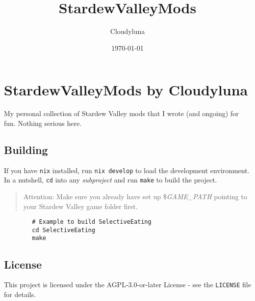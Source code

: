 \documentclass[a4paper,12pt]{article}
\title{StardewValleyMods}
\author{Cloudyluna}
\date{\today}
\begin{document}
	
	\section{StardewValleyMods by Cloudyluna}
	
	My personal collection of Stardew Valley mods that I wrote (and ongoing) for fun. Nothing serious here.
	
	
	\subsection{Building}
	
	If you have \texttt{nix} installed, run \texttt{nix develop} to load the development environment.
	In a nutshell, \texttt{cd} into any \textit{subproject} and run \texttt{make} to build the project.
	
	\begin{quote}
		Attention: Make sure you already have set up \$\textit{GAME\_PATH} pointing to your Stardew Valley game folder first.
	\end{quote}
	
	\begin{verbatim}
		# Example to build SelectiveEating
		cd SelectiveEating
		make
	\end{verbatim}
	
	\subsection{License}
	
	This project is licensed under the AGPL-3.0-or-later License - see the \texttt{LICENSE} file for details.
	
	
\end{document}
